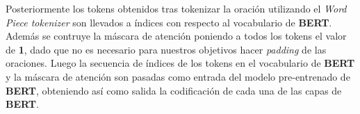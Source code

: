%
%		
%		
%	

Posteriormente los tokens obtenidos tras tokenizar la oraci\'on utilizando el \emph{Word Piece tokenizer} son llevados a \'indices con respecto al vocabulario de \textbf{BERT}. Adem\'as se contruye la m\'ascara de atenci\'on poniendo a todos los tokens el valor de \textbf{1}, dado que no es necesario para nuestros objetivos hacer \emph{padding} de las oraciones. Luego la secuencia de \'indices de los tokens en el vocabulario de \textbf{BERT} y la m\'ascara de atenci\'on son pasadas como entrada del modelo pre-entrenado de \textbf{BERT}, obteniendo as\'i como salida la codificaci\'on de cada una de las capas de \textbf{BERT}.

